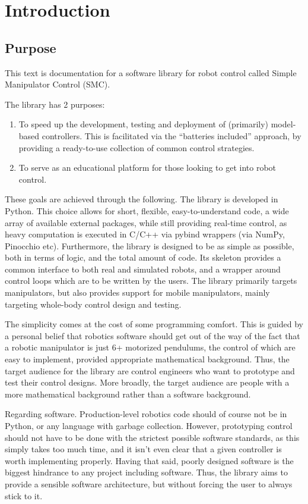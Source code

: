 \chapter{Introduction}

\section{Purpose}
This text is documentation for a software library for robot control called 
Simple Manipulator Control (SMC). 

The library has 2 purposes:
\begin{enumerate}
\item To speed up the development, testing and deployment
of (primarily) model-based controllers. This is facilitated via the 
``batteries included'' approach, 
by providing a ready-to-use collection of common control strategies.
\item To serve as an educational platform for those looking
	to get into robot control.
\end{enumerate}

These goals are achieved through the following.
The library is developed in Python. This choice allows
for short, flexible, easy-to-understand code, 
a wide array of available external packages,
while still providing real-time control, as heavy computation
is executed in C/C++ via pybind wrappers (via NumPy, Pinocchio etc).
Furthermore, the library is designed to be as simple as possible, 
both in terms of logic,
and the total amount of code. Its skeleton provides a common
interface to both real and simulated robots,
and a wrapper around control loops which are to be written by the users.
The library primarily targets manipulators, but also provides 
support for mobile manipulators,
mainly targeting whole-body control design and testing.

The simplicity comes at the cost of some programming comfort.
This is guided by a personal belief that robotics software 
should get out of the way
of the fact that a robotic manipulator is just 6+ motorized pendulums,
the control of which are easy to implement,
provided appropriate mathematical background.
Thus, the target audience for the library are control engineers
who want to prototype and test their control designs.
More broadly, the target audience  
are people with a more mathematical background
rather than a software background.

Regarding software.
Production-level robotics code should of course not be in Python,
or any language with garbage collection.
However, prototyping control should not have to be done
with the strictest possible software standards,
as this simply takes too much time, and it isn't even clear
that a given controller is worth implementing properly.
Having that said, poorly designed software is the 
biggest hindrance to any project including software.
Thus, the library aims to provide a sensible software architecture,
but without forcing the user to always stick to it.


